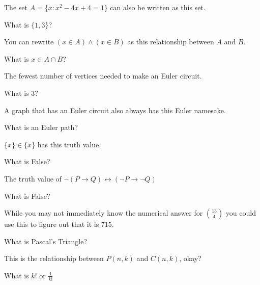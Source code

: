 \documentclass[10pt]{exam}
\begin{document}
\begin{questions}
\question The set \(A=\{x : x^2-4x+4=1\}\) can also be written as this set.
\begin{solution}
	What is \(\{1,3\}\)?
\end{solution}

\question You can rewrite \((x\in A)\wedge (x\in B)\) as this relationship between \(A\) and \(B\).
\begin{solution}
	What is \(x\in A\cap B\)?
\end{solution}
\question The fewest number of vertices needed to make an Euler circuit.

\begin{solution}
	What is 3?
\end{solution}

\question A graph that has an Euler circuit also always has this Euler namesake.

\begin{solution}
	What is an Euler path?
\end{solution}


\question \(\{x\}\in \{x\}\) has this truth value.
\begin{solution}
	What is False?
\end{solution}


\question The truth value of \(\neg(P\rightarrow Q) \leftrightarrow (\neg P \rightarrow\neg Q)\)

\begin{solution}
	What is False?
\end{solution}

\question While you may not immediately know the numerical answer for \(13 \choose 4\) you could use this to figure out that it is 715.
\begin{solution}
	What is Pascal's Triangle?
\end{solution}

\question This is the relationship between \(P(n,k)\) and \(C(n,k)\), okay?
\begin{solution}
	What is \(k!\) or \(\frac{1}{k!}\)
\end{solution}



\end{questions}
\end{document}
